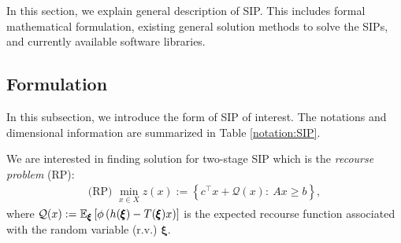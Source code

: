 In this section, we explain general description of SIP. This includes formal mathematical formulation, existing general solution methods to solve the SIPs, and currently available software libraries.
\subsection{Formulation}
In this subsection, we introduce the form of SIP of interest. The notations and dimensional information are summarized in Table \ref{notation:SIP}. 

We are interested in finding solution for two-stage SIP which is the \textit{recourse problem} (RP): 
\begin{align}
\textrm{(RP) }\min_{x\in X} z(x):={\left\{c^\top x + \mathcal{Q}(x):\ Ax\ge b\right\}}, \label{eq:SIP_1}
\end{align}
where $\mathcal{Q}(x):=\operatorname*{\mathbb{E}}_{\pmb{\xi}}\left[ \phi\left( h(\pmb{\xi})-T(\pmb{\xi})x \right) \right]$ is the expected recourse function associated with the random variable (r.v.) $\pmb{\xi}$. 

